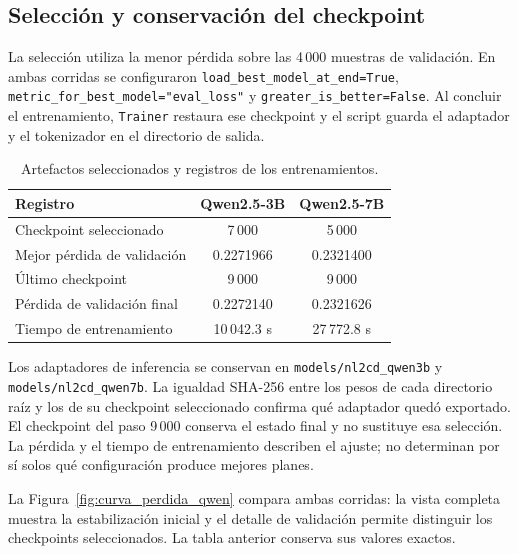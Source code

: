 \subsection{Selección y conservación del checkpoint}
\label{subsec:seleccion_checkpoint_qwen}

La selección utiliza la menor pérdida sobre las 4\,000 muestras de
validación. En ambas corridas se configuraron
\texttt{load\_\allowbreak best\_\allowbreak model\_\allowbreak at\_\allowbreak end=True},
\texttt{metric\_\allowbreak for\_\allowbreak best\_\allowbreak model="eval\_\allowbreak loss"} y
\texttt{greater\_\allowbreak is\_\allowbreak better=False}. Al concluir el entrenamiento,
\texttt{Trainer} restaura ese checkpoint y el script guarda el adaptador
y el tokenizador en el directorio de salida.

\begin{table}[htbp]
\centering
\small
\caption{Artefactos seleccionados y registros de los entrenamientos.}
\label{tab:checkpoints_qwen_impl}
\begin{tabularx}{\textwidth}{@{}Xcc@{}}
\toprule
\textbf{Registro} & \textbf{Qwen2.5-3B} & \textbf{Qwen2.5-7B} \\
\midrule
Checkpoint seleccionado & 7\,000 & 5\,000 \\
Mejor pérdida de validación & 0.2271966 & 0.2321400 \\
Último checkpoint & 9\,000 & 9\,000 \\
Pérdida de validación final & 0.2272140 & 0.2321626 \\
Tiempo de entrenamiento & 10\,042.3 s & 27\,772.8 s \\
\bottomrule
\end{tabularx}
\end{table}

Los adaptadores de inferencia se conservan en
\texttt{models/\allowbreak nl2cd\_\allowbreak qwen3b} y \texttt{models/\allowbreak nl2cd\_\allowbreak qwen7b}.
La igualdad SHA-256 entre los pesos de cada directorio raíz y los de su
checkpoint seleccionado confirma qué adaptador quedó exportado.
El checkpoint del paso 9\,000 conserva el estado final y no sustituye
esa selección. La pérdida y el tiempo de entrenamiento describen el
ajuste; no determinan por sí solos qué configuración produce mejores planes.

La Figura~\ref{fig:curva_perdida_qwen} compara ambas corridas: la vista
completa muestra la estabilización inicial y el detalle de validación
permite distinguir los checkpoints seleccionados. La tabla anterior
conserva sus valores exactos.


